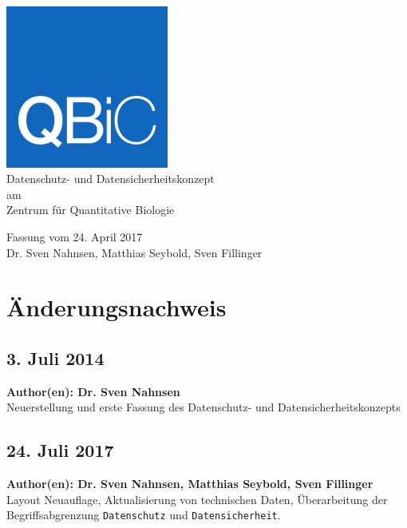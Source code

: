 \documentclass[]{scrreprt}
\begin{document}
\begin{titlepage}
\begin{center}
	\includegraphics[width=0.4\textwidth]{../figs/qbic_logo.png} \\
	\vspace{2cm}
	{\LARGE Datenschutz- und Datensicherheitskonzept \\
		am \\
		Zentrum für Quantitative Biologie\\[2cm]}
	
	{\large{Fassung vom 24. April 2017}\\[1cm]} %
	\vfill
	{\large Dr. Sven Nahnsen, Matthias Seybold, Sven Fillinger}
	
\end{center}
\begin{abstract}
	Hier kann man einen allgemeinen Einführungstext schreiben, zum Beispiel Motivation, Gesetzgebung und Ziele der Datensicherheitskonzepte am QBiC.
\end{abstract}
\end{titlepage}

\section*{Änderungsnachweis}
\subsection*{3. Juli 2014}
{\small\textbf{Author(en): Dr. Sven Nahnsen}}\\
Neuerstellung und erste Fassung des Datenschutz- und Datensicherheitskonzepts

\subsection*{24. Juli 2017}
{\small\textbf{Author(en): Dr. Sven Nahnsen, Matthias Seybold, Sven Fillinger}}\\
Layout Neuauflage, Aktualisierung von technischen Daten, Überarbeitung der Begriffsabgrenzung \texttt{Datenschutz} und \texttt{Datensicherheit}.
\newpage
\end{document}
